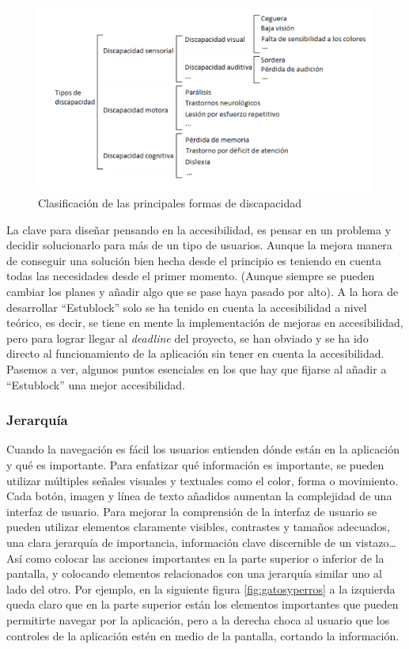\begin{figure}[h!]
  \centering
  \includegraphics[width=0.75\linewidth]{figs/Desarrollo/Accesibilidad/discapacidades}
  \caption[Clasificación de las principales formas de discapacidad]{Clasificación de las principales formas de discapacidad}
  \label{fig:discapacidad}
\end{figure}

La clave para diseñar pensando en la accesibilidad, es pensar en un problema y decidir solucionarlo para más de un tipo de usuarios. Aunque la mejora manera de conseguir una solución bien hecha desde el principio es teniendo en cuenta todas las necesidades desde el primer momento. (Aunque siempre se pueden cambiar los planes y añadir algo que se pase haya pasado por alto). A la hora de desarrollar ``Estublock'' solo se ha tenido en cuenta la accesibilidad a nivel teórico, es decir, se tiene en mente la implementación de mejoras en accesibilidad, pero para lograr llegar al \emph{deadline} del proyecto, se han obviado y se ha ido directo al funcionamiento de la aplicación sin tener en cuenta la accesibilidad. \\

Pasemos a ver, algunos puntos esenciales en los que hay que fijarse al añadir a ``Estublock'' una mejor accesibilidad.

\subsubsection{Jerarquía}
Cuando la navegación es fácil los usuarios entienden dónde están en la aplicación y qué es importante. Para enfatizar qué información es importante, se pueden utilizar múltiples señales visuales y textuales como el color, forma o movimiento. Cada botón, imagen y línea de texto añadidos aumentan la complejidad de una interfaz de usuario. Para mejorar la comprensión de la interfaz de usuario se pueden utilizar elementos claramente visibles, contrastes y tamaños adecuados, una clara jerarquía de importancia, información clave discernible de un vistazo\dots Así como colocar las acciones importantes en la parte superior o inferior de la pantalla, y colocando elementos relacionados con una jerarquía similar uno al lado del otro. Por ejemplo, en la siguiente figura \ref{fig:gatosyperros} a la izquierda queda claro que en la parte superior están los elementos importantes que pueden permitirte navegar por la aplicación, pero a la derecha choca al usuario que los controles de la aplicación estén en medio de la pantalla, cortando la información. 

